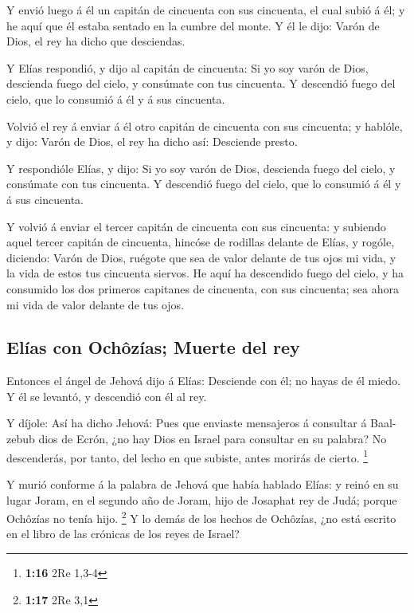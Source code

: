  Y envió luego á él un capitán de cincuenta con sus
cincuenta, el cual subió á él; y he aquí que él estaba sentado en la
cumbre del monte. Y él le dijo: Varón de Dios, el rey ha dicho que
desciendas.

 Y Elías respondió, y dijo al capitán de cincuenta: Si yo
soy varón de Dios, descienda fuego del cielo, y consúmate con tus
cincuenta. Y descendió fuego del cielo, que lo consumió á él y á sus
cincuenta.

 Volvió el rey á enviar á él otro capitán de cincuenta
con sus cincuenta; y hablóle, y dijo: Varón de Dios, el rey ha dicho
así: Desciende presto.

 Y respondióle Elías, y dijo: Si yo soy varón de Dios,
descienda fuego del cielo, y consúmate con tus cincuenta. Y descendió
fuego del cielo, que lo consumió á él y á sus cincuenta.

 Y volvió á enviar el tercer capitán de cincuenta con sus
cincuenta: y subiendo aquel tercer capitán de cincuenta, hincóse de
rodillas delante de Elías, y rogóle, diciendo: Varón de Dios, ruégote
que sea de valor delante de tus ojos mi vida, y la vida de estos tus
cincuenta siervos.  He aquí ha descendido fuego del
cielo, y ha consumido los dos primeros capitanes de cincuenta, con sus
cincuenta; sea ahora mi vida de valor delante de tus ojos.

\hypertarget{eluxedas-con-ochuxf4zuxedas-muerte-del-rey}{%
\subsection{Elías con Ochôzías; Muerte del
rey}\label{eluxedas-con-ochuxf4zuxedas-muerte-del-rey}}

 Entonces el ángel de Jehová dijo á Elías: Desciende con
él; no hayas de él miedo. Y él se levantó, y descendió con él al rey.

 Y díjole: Así ha dicho Jehová: Pues que enviaste
mensajeros á consultar á Baal-zebub dios de Ecrón, ¿no hay Dios en
Israel para consultar en su palabra? No descenderás, por tanto, del
lecho en que subiste, antes morirás de cierto. \footnote{\textbf{1:16}
  2Re 1,3-4}

 Y murió conforme á la palabra de Jehová que había
hablado Elías: y reinó en su lugar Joram, en el segundo año de Joram,
hijo de Josaphat rey de Judá; porque Ochôzías no tenía hijo. \footnote{\textbf{1:17}
  2Re 3,1}  Y lo demás de los hechos de Ochôzías, ¿no
está escrito en el libro de las crónicas de los reyes de Israel?

